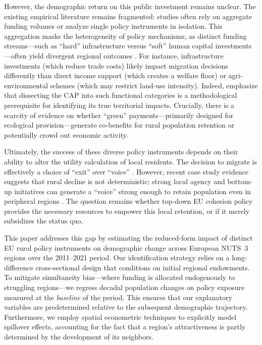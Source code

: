\documentclass[
	a4paper, %
	10pt, %
]{LTJournalArticle}
\begin{document}
However, the demographic return on this public investment remains unclear. The existing empirical literature remains fragmented: studies often rely on aggregate funding volumes or analyze single policy instruments in isolation. This aggregation masks the heterogeneity of policy mechanisms, as distinct funding streams—such as ``hard'' infrastructure versus ``soft'' human capital investments—often yield divergent regional outcomes \citep{RodriguezPose2004}. For instance, infrastructure investments (which reduce trade costs) likely impact migration decisions differently than direct income support (which creates a welfare floor) or agri-environmental schemes (which may restrict land-use intensity). Indeed, \cite{Camaioni2016} emphasize that dissecting the CAP into such functional categories is a methodological prerequisite for identifying its true territorial impacts. Crucially, there is a scarcity of evidence on whether ``green'' payments—primarily designed for ecological provision—generate co-benefits for rural population retention or potentially crowd out economic activity.

Ultimately, the success of these diverse policy instruments depends on their ability to alter the utility calculation of local residents. The decision to migrate is effectively a choice of ``exit'' over ``voice'' \citep{hirschman1970exit}. However, recent case study evidence suggests that rural decline is not deterministic; strong local agency and bottom-up initiatives can generate a ``voice'' strong enough to retain population even in peripheral regions \citep{Li_Bottom-up_initiatives}. The question remains whether top-down EU cohesion policy provides the necessary resources to empower this local retention, or if it merely subsidizes the status quo.

This paper addresses this gap by estimating the reduced-form impact of distinct EU rural policy instruments on demographic change across European NUTS~3 regions over the 2011–2021 period. Our identification strategy relies on a long-difference cross-sectional design that conditions on initial regional endowments. To mitigate simultaneity bias—where funding is allocated endogenously to struggling regions—we regress decadal population changes on policy exposure measured at the \textit{baseline} of the period. This ensures that our explanatory variables are predetermined relative to the subsequent demographic trajectory. Furthermore, we employ spatial econometric techniques to explicitly model spillover effects, accounting for the fact that a region's attractiveness is partly determined by the development of its neighbors.
\end{document}
